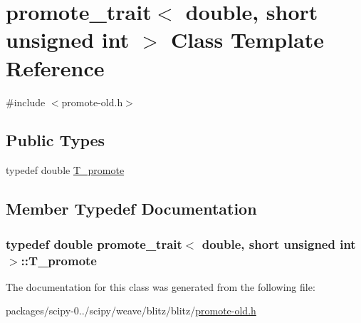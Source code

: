 \hypertarget{classpromote__trait_3_01double_00_01short_01unsigned_01int_01_4}{}\section{promote\+\_\+trait$<$ double, short unsigned int $>$ Class Template Reference}
\label{classpromote__trait_3_01double_00_01short_01unsigned_01int_01_4}


{\ttfamily \#include $<$promote-\/old.\+h$>$}

\subsection*{Public Types}
\begin{DoxyCompactItemize}
\item 
typedef double \hyperlink{classpromote__trait_3_01double_00_01short_01unsigned_01int_01_4_abe721386ec2bf27fdeefecf62f226cb7}{T\+\_\+promote}
\end{DoxyCompactItemize}


\subsection{Member Typedef Documentation}
\hypertarget{classpromote__trait_3_01double_00_01short_01unsigned_01int_01_4_abe721386ec2bf27fdeefecf62f226cb7}{}
\subsubsection[{T\+\_\+promote}]{\setlength{\rightskip}{0pt plus 5cm}typedef double {\bf promote\+\_\+trait}$<$ double, short unsigned int $>$\+::{\bf T\+\_\+promote}}\label{classpromote__trait_3_01double_00_01short_01unsigned_01int_01_4_abe721386ec2bf27fdeefecf62f226cb7}


The documentation for this class was generated from the following file\+:\begin{DoxyCompactItemize}
\item 
packages/scipy-\/0../scipy/weave/blitz/blitz/\hyperlink{promote-old_8h}{promote-\/old.\+h}\end{DoxyCompactItemize}
